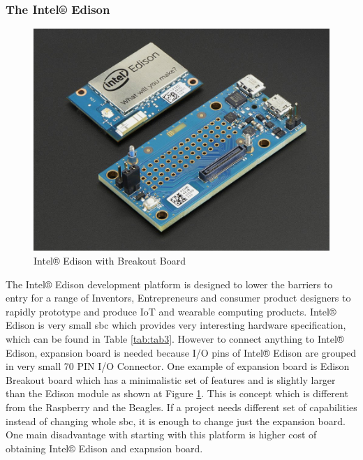 \subsubsection{The Intel® Edison} %
\label{ssub:the_intel_edison}
\begin{figure}[H]
\begin{center}
\captionsetup{font=small}
\includegraphics[scale=0.3]{pics/edison.jpg}
\caption{Intel® Edison with Breakout Board\cite{edison_pic}}
\label{fig:ch5}
\end{center}
\end{figure}
The Intel® Edison development platform is designed to lower the barriers to entry for a range of Inventors, Entrepreneurs and consumer product designers to rapidly prototype and produce IoT and wearable computing products.\cite{intel_what}\newline
Intel® Edison is very small \gls{sbc} which provides very interesting hardware specification, which can be found in Table \ref{tab:tab3}. However to connect anything to Intel® Edison, expansion board is needed because I/O pins of Intel® Edison are grouped in very small 70 PIN I/O Connector. One example of expansion board is Edison Breakout board which has a minimalistic set of features and is slightly larger than the Edison module as shown at Figure \ref{fig:ch5}. This is concept which is different from the Raspberry and the Beagles. If a project needs different set of capabilities instead of changing whole \gls{sbc}, it is enough to change just the expansion board. One main disadvantage with starting with this platform is higher cost of obtaining Intel® Edison and exapnsion board.
